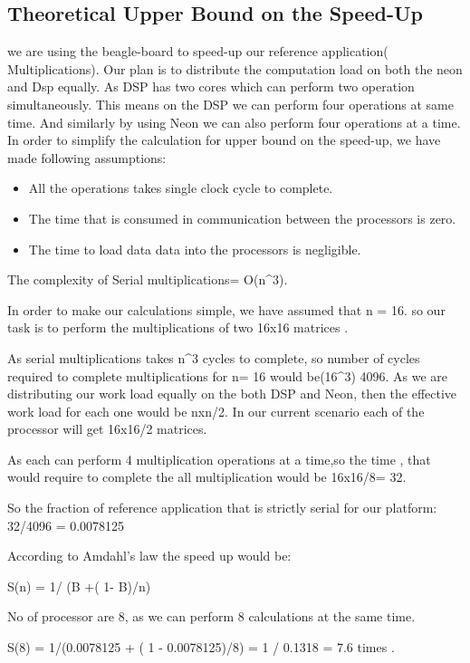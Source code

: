 \subsection{Theoretical Upper Bound on the Speed-Up}

we are using the beagle-board to speed-up our reference application( Multiplications). Our plan is to distribute the  computation load on both the neon and Dsp equally. As DSP has two cores which can perform two operation simultaneously. This means on the DSP we can perform four operations at same time. And similarly by using Neon we can also perform four operations at a time. 
In order to simplify the calculation for upper bound on the speed-up, we  have made following assumptions: 
\begin{itemize}
\item All the operations takes single clock cycle to complete.
\item The time that is consumed in communication between the processors is zero. 
\item The time to load data data into the processors is negligible. 
\end{itemize}

The complexity of Serial multiplications= O(n^3).

In order to make our calculations simple, we have assumed  that n = 16. so our task is to perform the  multiplications of two 16x16 matrices . 

As serial multiplications takes n^3 cycles to complete, so number of cycles required to complete multiplications  for n= 16  would be(16^3) 4096.
As  we are distributing our work load equally on the both DSP and Neon,  then the effective work load for each one would be nxn/2. In our current scenario each of the processor will get 16x16/2 matrices.

As each can perform 4 multiplication operations at a time,so the time , that would require to complete the  all multiplication would be 16x16/8=  32. 

So the fraction  of reference application that is strictly serial for our platform: 32/4096 = 0.0078125

According to Amdahl's law the speed up would be:

S(n) = 1/ (B +( 1- B)/n) 

No of processor are 8, as we can perform 8 calculations at the same time. 

S(8) = 1/(0.0078125 + ( 1 - 0.0078125)/8) = 1 / 0.1318 = 7.6 times . 

 